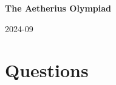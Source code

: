 \documentclass{exam}
\begin{document}
\begin{center}
	\LARGE{\textbf{The Aetherius Olympiad}}

	\vspace{8pt}

	\large{2024-09}
\end{center}

\section*{Questions}

\begin{questions}
	\question[7]{
	}
\end{questions}
\end{document}
